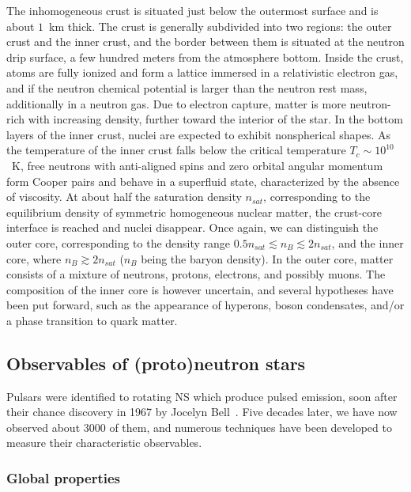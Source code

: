 The inhomogeneous crust is situated just below the outermost surface and is 
about $1$~km thick. 
The crust is generally subdivided into two regions: the outer crust and the 
inner crust, and the border between them is situated at the neutron drip 
surface, a few hundred meters from the atmosphere bottom.
Inside the crust, atoms are fully ionized and form a lattice immersed in a
relativistic electron gas, and if the neutron chemical potential is larger than 
the neutron rest mass, additionally in a neutron gas. 
Due to electron capture, matter is more neutron-rich with increasing density, 
further toward the interior of the star.
In the bottom layers of the inner crust, nuclei are expected to exhibit 
nonspherical shapes.
{As the temperature of the inner crust falls below the critical
temperature $T_c \sim 10^{10}$~K, free neutrons with anti-aligned spins and
zero orbital angular momentum form Cooper
pairs and behave in a superfluid state, characterized by the absence of 
viscosity.} 
At about half the saturation density $n_{sat}$, corresponding to the 
equilibrium density of symmetric homogeneous nuclear matter, the crust-core
interface is reached and nuclei disappear. Once again, we can distinguish the
outer core, corresponding to the density range $0.5n_{sat} \lesssim n_B 
\lesssim 2n_{sat}$, and the inner core, where $n_B \gtrsim 2n_{sat}$ ($n_B$
being the baryon density). 
In the outer core, matter consists of a mixture of neutrons, protons, 
electrons, and possibly muons. The composition of the inner core is however 
uncertain, and several hypotheses have been put forward, such as the appearance 
of hyperons, boson condensates, and/or a phase transition to quark 
matter.

\subsection*{Observables of (proto)neutron stars}

Pulsars were identified to rotating NS which produce pulsed emission, soon 
after their chance discovery in 1967 by Jocelyn Bell~\cite{Hewish1968}. Five
decades later, we have now observed about {3000} of them, and numerous 
techniques have been developed to measure their characteristic observables. 

\subsubsection*{Global properties}

